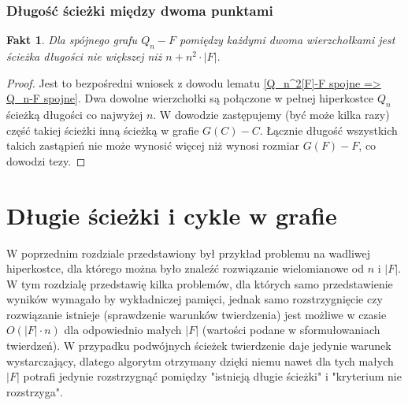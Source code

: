 \documentclass{pracamgr}
\newtheorem{fact}[theorem]{Fakt}
\begin{document}
   \subsection{Długość ścieżki między dwoma punktami}
    \begin{fact}
     Dla spójnego grafu $Q_n-F$ pomiędzy każdymi dwoma wierzchołkami jest ścieżka długości nie większej niż $n+n^2\cdot|F|$.
    \end{fact}
    \begin{proof}
     Jest to bezpośredni wniosek z dowodu lematu \ref{Q_n^2[F]-F spojne => Q_n-F spojne}. Dwa dowolne wierzchołki są połączone w pełnej hiperkostce $Q_n$
     ścieżką długości co najwyżej $n$. W dowodzie zastępujemy (być może kilka razy)
     część takiej ścieżki inną ścieżką w grafie $G(C)-C$. Łącznie długość wszystkich takich zastąpień nie może wynosić więcej niż wynosi rozmiar $G(F)-F$,
     co dowodzi tezy.
    \end{proof}

 \chapter{Długie ścieżki i cykle w grafie} %
  W poprzednim rozdziale przedstawiony był przykład problemu na wadliwej hiperkostce, dla którego można było znaleźć rozwiązanie wielomianowe od $n$ i $|F|$.
  W tym rozdzialę przedstawię kilka problemów, dla których samo przedstawienie wyników wymagało by wykładniczej pamięci,
  jednak samo rozstrzygnięcie czy rozwiązanie istnieje (sprawdzenie warunków twierdzenia) jest możliwe w czasie
  $O(|F|\cdot n)$ dla odpowiednio małych $|F|$ (wartości podane w sformułowaniach twierdzeń).
  W przypadku podwójnych ścieżek twierdzenie daje jedynie warunek wystarczający, dlatego algorytm otrzymany dzięki niemu nawet dla tych małych $|F|$ potrafi
  jedynie rozstrzygnąć pomiędzy "istnieją długie ścieżki" i "kryterium nie rozstrzyga".
\end{document}
